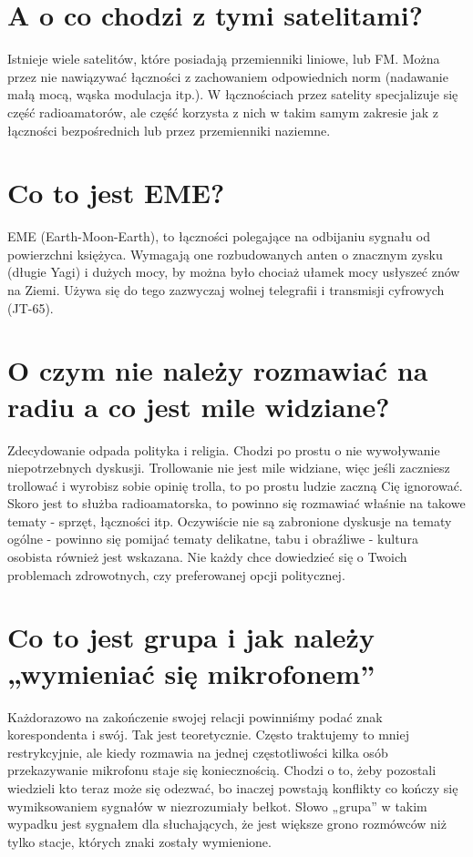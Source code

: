 \documentclass[a4paper,12pt]{article}
\begin{document}
\section{A o co chodzi z tymi satelitami?}
Istnieje wiele satelitów, które posiadają przemienniki liniowe, lub FM. Można przez nie nawiązywać łączności z zachowaniem odpowiednich norm (nadawanie małą mocą, wąska modulacja itp.). W łącznościach przez satelity specjalizuje się część radioamatorów, ale część korzysta z nich w takim samym zakresie jak z łączności bezpośrednich lub przez przemienniki naziemne.

\section{Co to jest EME?}
EME (Earth-Moon-Earth), to łączności polegające na odbijaniu sygnału od powierzchni księżyca. Wymagają one rozbudowanych anten o znacznym zysku (długie Yagi) i dużych mocy, by można było chociaż ułamek mocy usłyszeć znów na Ziemi. Używa się do tego zazwyczaj wolnej telegrafii i transmisji cyfrowych (JT-65).

\section{O czym nie należy rozmawiać na radiu a co jest mile widziane?}
Zdecydowanie odpada polityka i religia. Chodzi po prostu o nie wywoływanie niepotrzebnych dyskusji. Trollowanie nie jest mile widziane, więc jeśli zaczniesz trollować i wyrobisz sobie opinię trolla, to po prostu ludzie zaczną Cię ignorować.
Skoro jest to służba radioamatorska, to powinno się rozmawiać właśnie na takowe tematy - sprzęt, łączności itp. Oczywiście nie są zabronione dyskusje na tematy ogólne - powinno się pomijać tematy delikatne, tabu i obraźliwe - kultura osobista również jest wskazana. Nie każdy chce dowiedzieć się o Twoich problemach zdrowotnych, czy preferowanej opcji politycznej.

\section{Co to jest grupa i jak należy „wymieniać się mikrofonem”}
Każdorazowo na zakończenie swojej relacji powinniśmy podać znak korespondenta i swój. Tak jest teoretycznie. Często traktujemy to mniej restrykcyjnie, ale kiedy rozmawia na jednej częstotliwości kilka osób przekazywanie mikrofonu staje się koniecznością. Chodzi o to, żeby pozostali wiedzieli kto teraz może się odezwać, bo inaczej powstają konflikty co kończy się wymiksowaniem sygnałów w niezrozumiały bełkot. Słowo „grupa” w takim wypadku jest sygnałem dla słuchających, że jest większe grono rozmówców niż tylko stacje, których znaki zostały wymienione.
\end{document}

